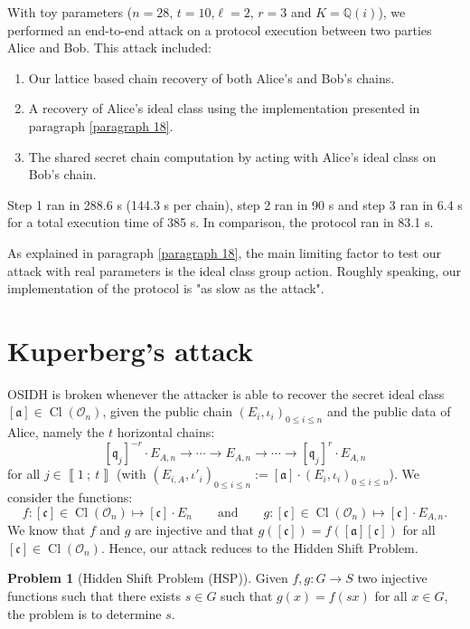 \documentclass[a4paper,10pt]{report}
\theoremstyle{definition}
\theoremstyle{plain}
\theoremstyle{definition}
\newtheorem{Problem}[Definition]{Problem}
\newcommand{\Q}{\mathbb{Q}}
\newcommand{\mO}{\mathcal{O}}
\renewcommand{\i}[2]{\left\llbracket #1~;~#2\right\rrbracket}
\renewcommand{\(}{\left(}
\renewcommand{\)}{\right)}
\newcommand{\mf}[1]{\mathfrak{#1}}
\DeclareMathOperator{\Cl}{Cl}
\begin{document}
With toy parameters ($n=28$, $t=10$,$\ell=2$, $r=3$ and $K=\Q(i)$), we performed an end-to-end attack on a protocol execution between two parties Alice and Bob. This attack included:
\begin{enumerate}
\item Our lattice based chain recovery of both Alice's and Bob's chains.
\item A recovery of Alice's ideal class using the implementation presented in paragraph \ref{paragraph 18}.
\item The shared secret chain computation by acting with Alice's ideal class on Bob's chain.
\end{enumerate}
Step 1 ran in 288.6 s (144.3 s per chain), step 2 ran in 90 s and step 3 ran in 6.4 s for a total execution time of 385 s. In comparison, the protocol ran in 83.1 s.

As explained in paragraph \ref{paragraph 18}, the main limiting factor to test our attack with real parameters is the ideal class group action. Roughly speaking, our implementation of the protocol is "as slow as the attack".

\section{Kuperberg's attack}

OSIDH is broken whenever the attacker is able to recover the secret ideal class $[\mf{a}]\in\Cl(\mO_n)$, given the public chain $(E_i,\iota_i)_{0\leq i\leq n}$ and the public data of Alice, namely the $t$ horizontal chains:
\[[\mf{q}_j]^{-r}\cdot E_{A,n}\longrightarrow \cdots \longrightarrow E_{A,n} \longrightarrow \cdots \longrightarrow [\mf{q}_j]^{r}\cdot E_{A,n}\]
for all $j\in\i{1}{t}$ (with $(E_{i,A},\iota'_i)_{0\leq i\leq n}:=[\mf{a}]\cdot (E_i,\iota_i)_{0\leq i\leq n}$). We consider the functions:
\[f: [\mf{c}]\in\Cl(\mO_n)\longmapsto [\mf{c}]\cdot E_n \qquad \mbox{and} \qquad g: [\mf{c}]\in\Cl(\mO_n)\longmapsto [\mf{c}]\cdot E_{A,n}.\]
We know that $f$ and $g$ are injective and that $g([\mf{c}])=f([\mf{a}][\mf{c}])$ for all $[\mf{c}]\in\Cl(\mO_n)$. Hence, our attack reduces to the Hidden Shift Problem.

\begin{Problem}[Hidden Shift Problem (HSP)]\label{Problem 4}
Given $f,g: G\longrightarrow S$ two injective functions such that there exists $s\in G$ such that $g(x)=f(sx)$ for all $x\in G$, the problem is to determine $s$.
\end{Problem}
\end{document}
